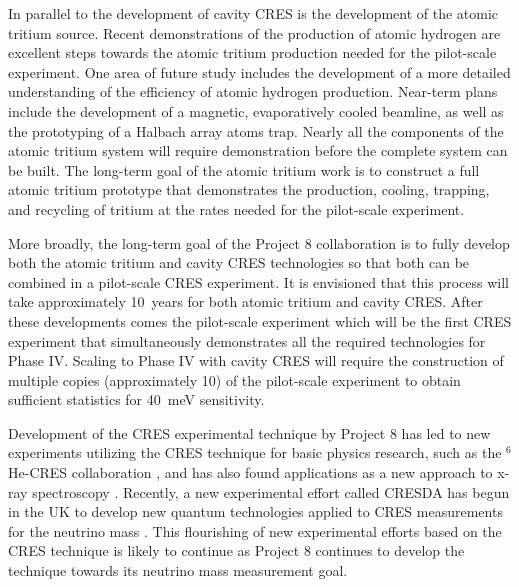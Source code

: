 In parallel to the development of cavity CRES is the development of the atomic tritium source. Recent demonstrations of the production of atomic hydrogen are excellent steps towards the atomic tritium production needed for the pilot-scale experiment. One area of future study includes the development of a more detailed understanding of the efficiency of atomic hydrogen production. Near-term plans include the development of a magnetic, evaporatively cooled beamline, as well as the prototyping of a Halbach array atoms trap. Nearly all the components of the atomic tritium system will require demonstration before the complete system can be built. The long-term goal of the atomic tritium work is to construct a full atomic tritium prototype that demonstrates the production, cooling, trapping, and recycling of tritium at the rates needed for the pilot-scale experiment.

More broadly, the long-term goal of the Project 8 collaboration is to fully develop both the atomic tritium and cavity CRES technologies so that both can be combined in a pilot-scale CRES experiment. It is envisioned that this process will take approximately 10~years for both atomic tritium and cavity CRES. After these developments comes the pilot-scale experiment which will be the first CRES experiment that simultaneously demonstrates all the required technologies for Phase IV. Scaling to Phase IV with cavity CRES will require the construction of multiple copies (approximately 10) of the pilot-scale experiment to obtain sufficient statistics for 40~meV sensitivity.

Development of the CRES experimental technique by Project 8 has led to new experiments utilizing the CRES technique for basic physics research, such as the $^6$He-CRES collaboration \cite{cresHe6}, and has also found applications as a new approach to x-ray spectroscopy \cite{cresXrayKazkaz}. Recently, a new experimental effort called CRESDA has begun in the UK to develop new quantum technologies applied to CRES measurements for the neutrino mass \cite{cresda}. This flourishing of new experimental efforts based on the CRES technique is likely to continue as Project 8 continues to develop the technique towards its neutrino mass measurement goal.

